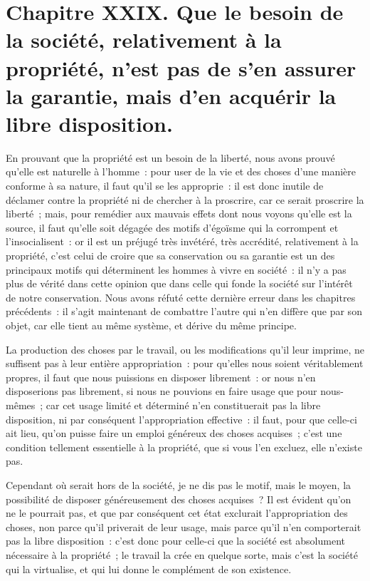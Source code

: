 \documentclass[french,twoside]{book} %
\newcommand\chapteropen{} %
\newcommand\chaptercont{} %
\begin{document}
\chapteropen
\chapter[{Chapitre XXIX. Que le besoin de la société, relativement à la propriété, n’est pas de s’en assurer la garantie, mais d’en acquérir la libre disposition.}]{Chapitre XXIX. Que le besoin de la société, relativement à la propriété, n’est pas de s’en assurer la garantie, mais d’en acquérir la libre disposition.}\renewcommand{\leftmark}{Chapitre XXIX. Que le besoin de la société, relativement à la propriété, n’est pas de s’en assurer la garantie, mais d’en acquérir la libre disposition.}


\chaptercont
\noindent En prouvant que la propriété est un besoin de la liberté, nous avons prouvé qu’elle est naturelle à l’homme : pour user de la vie et des choses d’une manière conforme à sa nature, il faut qu’il se les approprie : il est donc inutile de déclamer contre la propriété ni de chercher à la proscrire, car ce serait proscrire la liberté ; mais, pour remédier aux mauvais effets dont nous voyons qu’elle est la source, il faut qu’elle soit dégagée des motifs d’égoïsme qui la corrompent et l’insocialisent : or il est un préjugé très invétéré, très accrédité, relativement à la propriété, c’est celui de croire que sa conservation ou sa garantie est un des principaux motifs qui déterminent les hommes à vivre en société : il n’y a pas plus de vérité dans cette opinion que dans celle qui fonde la société sur l’intérêt de notre conservation. Nous avons réfuté cette dernière erreur dans les chapitres précédents : il s’agit maintenant de combattre l’autre qui n’en diffère que par son objet, car elle tient au même système, et dérive du même principe.\par
La production des choses par le travail, ou les modifications qu’il leur imprime, ne suffisent pas à leur entière appropriation : pour qu’elles nous soient véritablement propres, il faut que nous puissions en disposer librement : or nous n’en disposerions pas librement, si nous ne pouvions en faire usage que pour nous-mêmes ; car cet usage limité et déterminé n’en constituerait pas la libre disposition, ni par conséquent l’appropriation effective : il faut, pour que celle-ci ait lieu, qu’on puisse faire un emploi généreux des choses acquises ; c’est une condition tellement essentielle à la propriété, que si vous l’en excluez, elle n’existe pas.\par
Cependant où serait hors de la société, je ne dis pas le motif, mais le moyen, la possibilité de disposer généreusement des choses acquises ? Il est évident qu’on ne le pourrait pas, et que par conséquent cet état exclurait l’appropriation des choses, non parce qu’il priverait de leur usage, mais parce qu’il n’en comporterait pas la libre disposition : c’est donc pour celle-ci que la société est absolument nécessaire à la propriété ; le travail la crée en quelque sorte, mais c’est la société qui la virtualise, et qui lui donne le complément de son existence.\par
\end{document}
